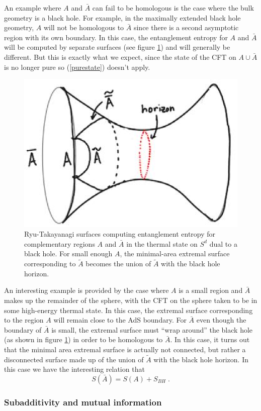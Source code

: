 \documentclass[12pt,epsf]{article}
\newcommand{\be}{\begin{equation}}
\newcommand{\ee}{\end{equation}}
\begin{document}
An example where $A$ and $\bar{A}$ can fail to be homologous is the case where the bulk geometry is a black hole. For example, in the maximally extended black hole geometry, $A$ will not be homologous to $\bar{A}$ since there is a second asymptotic region with its own boundary. In this case, the entanglement entropy for $A$ and $\bar{A}$ will be computed by separate surfaces (see figure \ref{BHhomology}) and will generally be different. But this is exactly what we expect, since the state of the CFT on $A \cup \bar{A}$ is no longer pure so (\ref{purestate}) doesn't apply.

\begin{figure}
\centering
\includegraphics[width = 0.4 \textwidth]{BHhomology.eps}
\caption{Ryu-Takayanagi surfaces computing entanglement entropy for complementary regions $A$ and $\bar{A}$ in the thermal state on $S^d$ dual to a black hole. For small enough $A$, the minimal-area extremal surface corresponding to $\tilde{A}$ becomes the union of $\tilde{A}$ with the black hole horizon.}
\label{BHhomology}
\end{figure}

An interesting example is provided by the case where $A$ is a small region and $\bar{A}$ makes up the remainder of the sphere, with the CFT on the sphere taken to be in some high-energy thermal state. In this case, the extremal surface corresponding to the region $A$ will remain close to the AdS boundary. For $\bar{A}$ even though the boundary of $\bar{A}$ is small, the extremal surface must ``wrap around'' the black hole (as shown in figure \ref{BHhomology}) in order to be homologous to $\bar{A}$. In this case, it turns out that the minimal area extremal surface is actually not  connected, but rather a disconnected surface made up of the union of $\tilde{A}$ with the black hole horizon. In this case we have the interesting relation that
\be
S(\bar{A}) = S(A) + S_{BH} \; .
\ee

\subsubsection*{Subadditivity and mutual information}
\end{document}
